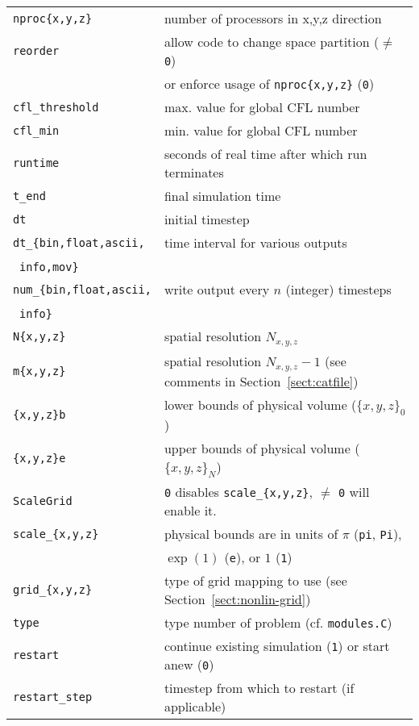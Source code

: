 \begin{table}
\begin{tabular}{|ll|} \hline
  {\tt nproc\{x,y,z\}} & number of processors in x,y,z direction \\
  {\tt reorder} & allow code to change space partition ($\ne$ {\tt 0}) \\
  & or enforce usage of {\tt nproc\{x,y,z\}} ({\tt 0}) \\
  {\tt cfl\_threshold} & max. value for global CFL number \\
  {\tt cfl\_min} & min. value for global CFL number \\
  {\tt runtime} & seconds of real time after which run terminates \\
  {\tt t\_end } & final simulation time \\
  {\tt dt     } & initial timestep \\
  {\tt dt\_\{bin,float,ascii,} & time interval for various outputs \\
  \quad \ {\tt info,mov\} } & \\
  {\tt num\_\{bin,float,ascii,} & write output every $n$ (integer) timesteps \\
  \quad \ {\tt info\} } & \\
  {\tt N\{x,y,z\}} & spatial resolution $N_{x,y,z}$ \\
  {\tt m\{x,y,z\}} & spatial resolution $N_{x,y,z}-1$ (see comments in
  Section~\ref{sect:catfile}) \\
  {\tt \{x,y,z\}b} & lower bounds of physical volume ($\{x,y,z\}_0$) \\
  {\tt \{x,y,z\}e} & upper bounds of physical volume ($\{x,y,z\}_N$) \\
  {\tt ScaleGrid} & {\tt 0} disables {\tt scale\_\{x,y,z\}}, $\ne$ {\tt 0}
  will enable it. \\
  {\tt scale\_\{x,y,z\}} & physical bounds are in units of
  $\pi$ ({\tt pi}, {\tt Pi}), \\
  & $\exp(1)$ ({\tt e}), or $1$ ({\tt 1}) \\ 
  {\tt grid\_\{x,y,z\}} & type of grid mapping to use
  (see Section~\ref{sect:nonlin-grid}) \\
  {\tt type } & type number of problem (cf. {\tt modules.C}) \\
  {\tt restart} & continue existing simulation ({\tt 1}) or start
  anew ({\tt 0}) \\
  {\tt restart\_step} & timestep from which to restart (if applicable) \\

\end{tabular}
\end{table}
